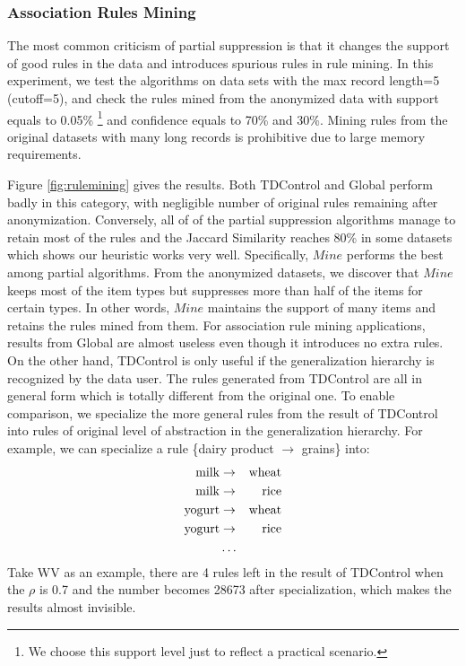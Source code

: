 \subsubsection{Association Rules Mining}\label{sec:eval:rulemining}
The most common criticism of partial suppression is that it
changes the support of good rules in the data and introduces spurious
rules in rule mining. In this experiment, we test the algorithms on
data sets with the max record length=5 (cutoff=5),
and check the rules mined from the anonymized data
with support equals to 0.05\% \footnote{We choose this support level just to
reflect a practical scenario.} and confidence equals to 70\% and 30\%.
Mining rules from the original datasets with many
long records is prohibitive due to large memory requirements.

Figure \ref{fig:rulemining} gives the results.
Both TDControl and Global perform badly in this category, with
negligible number of original rules remaining after anonymization.
Conversely, all of of the partial
suppression algorithms manage to retain most of the rules and the Jaccard Similarity reaches 80\% in some datasets which shows
our heuristic works very well. Specifically, $Mine$ performs
the best among partial algorithms. From the anonymized datasets, we discover
that $Mine$ keeps most of the item types but suppresses more than half of
the items for certain types. In other words,
$Mine$ maintains the support of many items and retains the rules mined from them.
For association rule mining applications, results from Global are almost
useless even though it introduces no extra rules. On the other hand, TDControl
is only useful if the generalization hierarchy is recognized by the data user.
The rules generated from TDControl are all in general form which is
totally different from the original one. To enable comparison,
we specialize the more general rules from the result of TDControl
into rules of original level of abstraction in the generalization hierarchy.
For example, we can specialize a rule \{dairy product $\rightarrow$ grains\}
into:
\begin{eqnarray*}
\rm{milk} &\rightarrow& \rm{wheat} \\
\rm{milk} &\rightarrow& \rm{rice} \\
\rm{yogurt} &\rightarrow& \rm{wheat} \\
\rm{yogurt} &\rightarrow& \rm{rice}\\
& \ldots &
\end{eqnarray*}
Take WV as an example, there are 4 rules left in the result of TDControl when
the $\rho$ is 0.7 and the number becomes 28673 after specialization, which makes
the results almost invisible.




